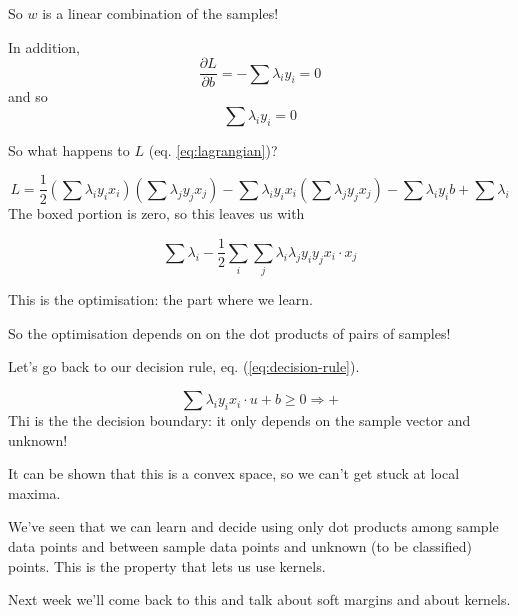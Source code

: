 So $w$ is a linear combination of the samples!

In addition,
\begin{displaymath}
  \frac{\partial L}{\partial b} = -\sum \lambda_i y_i = 0
\end{displaymath}
and so
\begin{equation}
  \label{eq:b}
  \sum \lambda_i y_i = 0
\end{equation}

So what happens to $L$ (eq. \ref{eq:lagrangian})?

\bigskip

\begin{equation}
  \label{eq:learning-rule}
  L = \frac 12 \left( \sum \lambda_i y_i x_i\right)
  \left(\sum \lambda_j y_j x_j\right)
  -
  \sum \lambda_i y_i x_i
  \left(\sum \lambda_j y_j x_j\right)
  - \boxed{\sum \lambda_i y_i} b + \sum \lambda_i
\end{equation}
The boxed portion is zero, so this leaves us with
\hspace{2mm} 

\begin{equation}
  \label{eq:recognition-rule}
  \sum\lambda_i - \frac 12 \sum_i \sum_j \lambda_i \lambda_j y_i y_j
  x_i\cdot x_j
\end{equation}

This is the optimisation: the part where we learn.

So the optimisation depends on on the dot products of pairs of
samples!

\bigskip

Let's go back to our decision rule, eq. (\ref{eq:decision-rule}).

\begin{displaymath}
  \sum \lambda_i y_i x_i\cdot u + b \ge 0 \Rightarrow +
\end{displaymath}
Thi is the the decision boundary: it only depends on the sample vector
and unknown!

It can be shown that this is a convex space, so we can't get stuck at
local maxima.

We've seen that we can learn and decide using only dot products among
sample data points and between sample data points and unknown (to be
classified) points.  This is the property that lets us use kernels.

\bigskip

Next week we'll come back to this and talk about soft margins and
about kernels.

